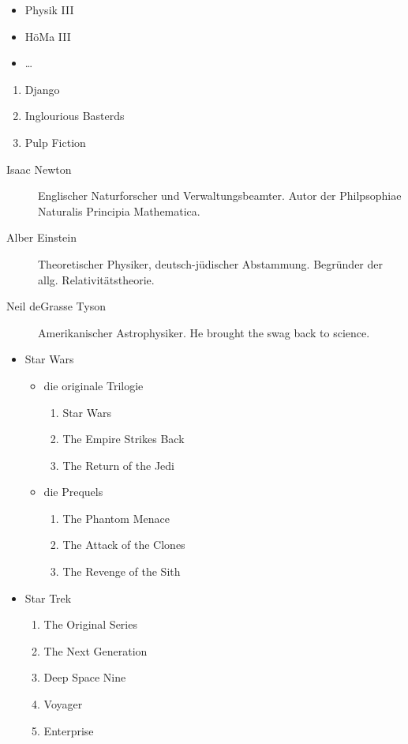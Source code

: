 \documentclass{scrartcl}
\begin{document}
\begin{itemize}
  \item Physik III
  \item HöMa III
  \item …
\end{itemize}

\begin{enumerate}
  \item Django
  \item Inglourious Basterds
  \item Pulp Fiction
\end{enumerate}

\begin{description}
  \item[Isaac Newton] Englischer Naturforscher und Verwaltungsbeamter.
    Autor der Philpsophiae Naturalis Principia Mathematica.
  \item[Alber Einstein] Theoretischer Physiker, deutsch-jüdischer Abstammung.
    Begründer der allg. Relativitätstheorie.
  \item[Neil deGrasse Tyson] Amerikanischer Astrophysiker.
    He brought the swag back to science.
\end{description}

\begin{itemize}
  \item Star Wars
    \begin{itemize}
      \item die originale Trilogie
        \begin{enumerate}
          \item Star Wars
          \item The Empire Strikes Back
          \item The Return of the Jedi
        \end{enumerate}
      \item die Prequels
        \begin{enumerate}
          \item The Phantom Menace
          \item The Attack of the Clones
          \item The Revenge of the Sith
        \end{enumerate}
    \end{itemize}
  \item Star Trek
    \begin{enumerate}
      \item The Original Series
      \item The Next Generation
      \item Deep Space Nine
      \item Voyager
      \item Enterprise
    \end{enumerate}
\end{itemize}
\end{document}
